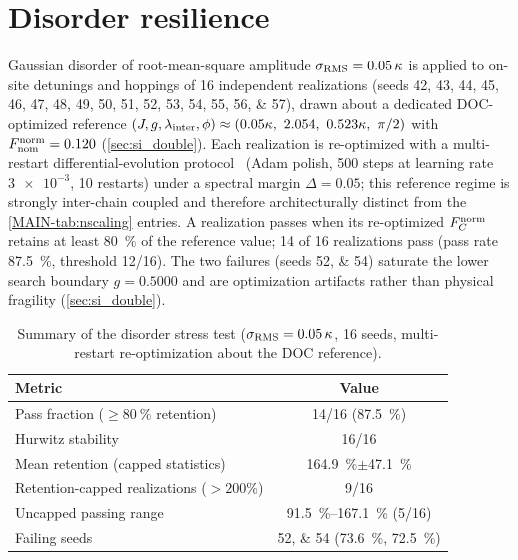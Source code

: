 \documentclass[aps,prxquantum,preprint,superscriptaddress,amsmath,amssymb]{revtex4-2}
\newcommand{\Fnorm}{F_C^{\rm norm}}
\newcommand{\lint}{\lambda_{\rm inter}}
\begin{document}
\section{Disorder resilience}
\label{sec:si_disorder}

Gaussian disorder of root-mean-square amplitude $\sigma_{\rm RMS}=\qty{0.05}{\kappa}$ is applied to on-site detunings and hoppings of 16 independent realizations (seeds \numlist{42;43;44;45;46;47;48;49;50;51;52;53;54;55;56;57}), drawn about a dedicated DOC-optimized reference $(J,g,\lint,\phi)\approx(\num{0.05}\kappa,\ \num{2.054},\ \num{0.523}\kappa,\ \pi/2)$ with $F^{\rm norm}_{\rm nom}=\num{0.120}$ (\cref{sec:si_double}). Each realization is re-optimized with a multi-restart differential-evolution protocol~\citep{Storn1997} (Adam polish, 500 steps at learning rate $\num{3e-3}$, 10 restarts) under a spectral margin $\Delta=\num{0.05}$; this reference regime is strongly inter-chain coupled and therefore architecturally distinct from the \cref{MAIN-tab:nscaling} entries. A realization passes when its re-optimized $\Fnorm$ retains at least \qty{80}{\percent} of the reference value; \num{14} of \num{16} realizations pass (pass rate \qty{87.5}{\percent}, threshold \num{12}/\num{16}). The two failures (seeds \numlist{52;54}) saturate the lower search boundary $g=\num{0.5000}$ and are optimization artifacts rather than physical fragility (\cref{sec:si_double}).

\begin{table}[hbt]
\centering
\caption{Summary of the disorder stress test ($\sigma_{\rm RMS}=\qty{0.05}{\kappa}$, 16 seeds, multi-restart re-optimization about the DOC reference).}
\label{tab:si_disorder}
\begin{tabular}{lc}
\toprule
Metric & Value \\
\midrule
Pass fraction ($\ge\qty{80}{\percent}$ retention) & 14/16 (\qty{87.5}{\percent}) \\
Hurwitz stability & 16/16 \\
Mean retention (capped statistics) & \qty{164.9}{\percent}$\pm$\qty{47.1}{\percent} \\
Retention-capped realizations ($>200\%$) & 9/16 \\
Uncapped passing range & \qty{91.5}{\percent}--\qty{167.1}{\percent} (5/16) \\
Failing seeds & \numlist{52;54} (\qty{73.6}{\percent}, \qty{72.5}{\percent}) \\
\bottomrule
\end{tabular}
\end{table}
\end{document}
